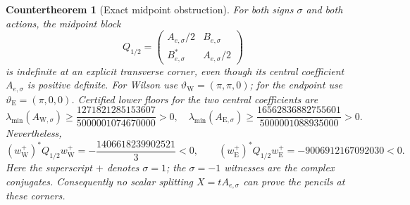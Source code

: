 \documentclass[11pt,oneside]{article}
\newtheorem{countertheorem}[theorem]{Countertheorem}
\theoremstyle{definition}
\theoremstyle{remark}
\begin{document}
\begin{countertheorem}[Exact midpoint obstruction]
\label{ctr:newv2-midpoint}
For both signs \(\sigma\) and both actions, the midpoint block
\[
 Q_{1/2}=
 \begin{pmatrix}A_{e,\sigma}/2&B_{e,\sigma}\\
 B_{e,\sigma}^*&A_{e,\sigma}/2\end{pmatrix}               \tag{2.23}
\]
is indefinite at an explicit transverse corner, even though its
central coefficient \(A_{e,\sigma}\) is positive definite.
For Wilson use
\(\vartheta_{\mathrm W}=(\pi,\pi,0)\); for the endpoint use
\(\vartheta_{\mathrm E}=(\pi,0,0)\).  Certified lower floors for
the two central coefficients are
\[
 \lambda_{\min}(A_{\mathrm W,\sigma})
 \ge\frac{1271821285153607}{5000001074670000}>0,
\quad
 \lambda_{\min}(A_{\mathrm E,\sigma})
 \ge\frac{16562836882755601}{5000001088935000}>0.         \tag{2.24}
\]
Nevertheless,
\[
 (w_{\mathrm W}^{+})^*Q_{1/2}w_{\mathrm W}^{+}
 =-\frac{1406618239902521}{3}<0,\qquad
 (w_{\mathrm E}^{+})^*Q_{1/2}w_{\mathrm E}^{+}
 =-9006912167092030<0.                                   \tag{2.25}
\]
Here the superscript \(+\) denotes \(\sigma=1\); the
\(\sigma=-1\) witnesses are the complex conjugates.  Consequently
no scalar splitting \(X=tA_{e,\sigma}\) can prove the pencils at
these corners.
\end{countertheorem}
\end{document}

